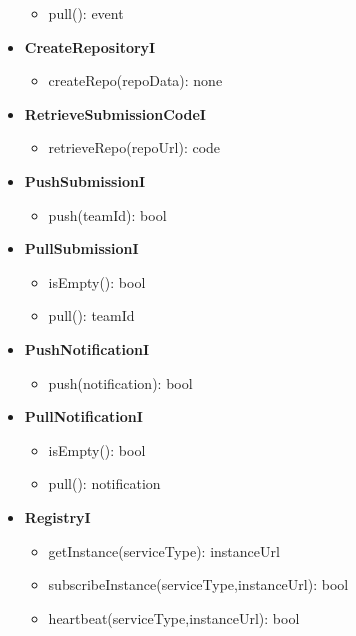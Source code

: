 \begin{itemize}
\begin{itemize}
        \item pull(): event
    \end{itemize}
    \item \textbf{CreateRepositoryI}
    \begin{itemize}
        \item createRepo(repoData): none
    \end{itemize}
    \item \textbf{RetrieveSubmissionCodeI}
    \begin{itemize}
        \item retrieveRepo(repoUrl): code
    \end{itemize}
    \item \textbf{PushSubmissionI}
    \begin{itemize}
        \item push(teamId): bool
    \end{itemize}
    \item \textbf{PullSubmissionI}
    \begin{itemize}
        \item isEmpty(): bool
        \item pull(): teamId
    \end{itemize}
    \item \textbf{PushNotificationI}
    \begin{itemize}
        \item push(notification): bool
    \end{itemize}
    \item \textbf{PullNotificationI}
    \begin{itemize}
        \item isEmpty(): bool
        \item pull(): notification
    \end{itemize}
    \item \textbf{RegistryI}
    \begin{itemize}
        \item getInstance(serviceType): instanceUrl
        \item subscribeInstance(serviceType,instanceUrl): bool
        \item heartbeat(serviceType,instanceUrl): bool
    \end{itemize}
\end{itemize}

